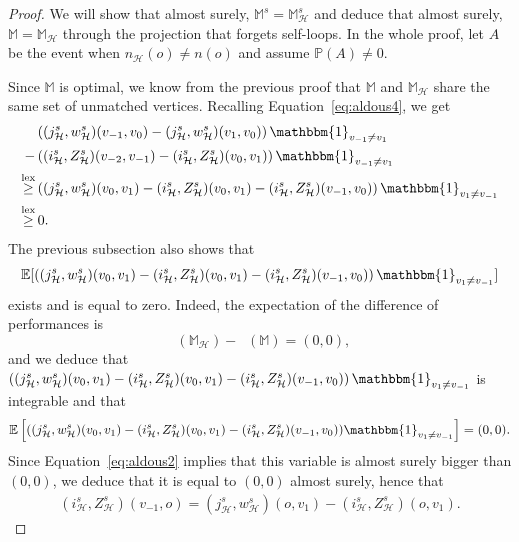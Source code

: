 \documentclass[11pt]{article}
\DeclareMathOperator{\lex}{lex}
\DeclareMathOperator{\perfV}{perf_V}
\begin{document}
\begin{proof}
We will show that almost surely, $\mathbb{M}^s=\mathbb{M}_{\mathcal{H}}^s$ and deduce that almost surely, $\mathbb{M}=\mathbb{M}_{\mathcal{H}}$ through the projection that forgets self-loops. In the whole proof, let $A$ be the event when $n_{\mathcal{H}}(o)\neq n(o)$ and assume $\mathbb P(A) \neq 0$.


Since $\mathbb{M}$ is optimal, we know from the previous proof that $\mathbb{M}$ and $\mathbb{M}_{\mathcal{H}}$ share the same set of unmatched vertices. 
Recalling Equation~\eqref{eq:aldous4}, we get
\begin{align*}
&\left((j_{\mathcal{H}}^s,w_{\mathcal{H}}^s)(v_{-1},v_0)-(j_{\mathcal{H}}^s,w_{\mathcal{H}}^s)(v_{1},v_0) \right)\mathbbm{1}_{v_{-1} \neq v_1} \\
-&\left((i^s_{\mathcal{H}},Z^s_{\mathcal{H}})(v_{-2},v_{-1}) -(i^s_{\mathcal{H}},Z^s_{\mathcal{H}})(v_{0},v_{1})\right)\mathbbm{1}_{v_{-1} \neq v_1} \\
\overset{\lex}{\geq}&\left((j_{\mathcal{H}}^s,w_{\mathcal{H}}^s)(v_0,v_1)-(i^s_{\mathcal{H}},Z^s_{\mathcal{H}})(v_0,v_1)-(i^s_{\mathcal{H}},Z^s_{\mathcal{H}})(v_{-1},v_0)\right)\mathbbm{1}_{v_1 \neq v_{-1}} \\
\overset{\lex}{\geq} &\,0.
\end{align*}
The previous subsection also shows that
\[
\mathbb{E}[\left((j_{\mathcal{H}}^s,w_{\mathcal{H}}^s)(v_0,v_1)-(i^s_{\mathcal{H}},Z^s_{\mathcal{H}})(v_0,v_1)-(i^s_{\mathcal{H}},Z^s_{\mathcal{H}})(v_{-1},v_0)\right)\mathbbm{1}_{v_1 \neq v_{-1}}]
\]
exists and is equal to zero. Indeed, the expectation of the difference of performances is 
\[
\perfV(\mathbb{M}_{\mathcal{H}})-\perfV(\mathbb{M})=(0,0),
\]
and we deduce that $\left((j_{\mathcal{H}}^s,w_{\mathcal{H}}^s)(v_0,v_1)-(i^s_{\mathcal{H}},Z^s_{\mathcal{H}})(v_0,v_1)-(i^s_{\mathcal{H}},Z^s_{\mathcal{H}})(v_{-1},v_0)\right)\mathbbm{1}_{v_1 \neq v_{-1}}$ is integrable and that
\begin{align*}
\mathbb{E}\left[((j_{\mathcal{H}}^s,w_{\mathcal{H}}^s)(v_0,v_1)-(i^s_{\mathcal{H}},Z^s_{\mathcal{H}})(v_0,v_1)-(i^s_{\mathcal{H}},Z^s_{\mathcal{H}})(v_{-1},v_0))\mathbbm{1}_{v_1 \neq v_{-1}} \right]=(0,0) .
\end{align*}
Since Equation~\ref{eq:aldous2} implies that this variable is almost surely bigger than $(0,0)$, we deduce that it is equal to $(0,0)$ almost surely, hence that
\begin{align}\label{eq:Aldous5}
(i^s_{\mathcal{H}},Z^s_{\mathcal{H}})(v_{-1},o) =(j_{\mathcal{H}}^s,w_{\mathcal{H}}^s)(o,v_1)-(i^s_{\mathcal{H}},Z^s_{\mathcal{H}})(o,v_1).

\end{align}
\end{proof}
\end{document}
